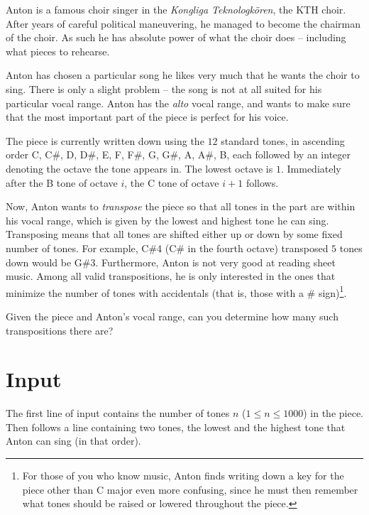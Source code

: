 
%
\noindent
Anton is a famous choir singer in the \emph{Kongliga Teknologkören}, the KTH choir.
After years of careful political maneuvering, he managed to become the chairman of the choir.
As such he has absolute power of what the choir does -- including what pieces to rehearse.

Anton has chosen a particular song he likes very much that he wants the choir to sing.
There is only a slight problem -- the song is not at all suited for his particular vocal range.
Anton has the \emph{alto} vocal range, and wants to make sure that the most important part of the piece is perfect for his voice.

The piece is currently written down using the $12$ standard tones, in ascending order C, C\#, D, D\#, E, F, F\#, G, G\#, A, A\#, B, each followed by an integer denoting the octave the tone appears in.
The lowest octave is $1$.
Immediately after the B tone of octave $i$, the C tone of octave $i + 1$ follows.

Now, Anton wants to \emph{transpose} the piece so that all tones in the part are within his vocal range, which is given by the lowest and highest tone he can sing.
Transposing means that all tones are shifted either up or down by some fixed number of tones.
For example, C\#4 (C\# in the fourth octave) transposed $5$ tones down would be G\#3.
Furthermore, Anton is not very good at reading sheet music.
Among all valid transpositions, he is only interested in the ones that minimize the number of tones with accidentals (that is, those with a \# sign)\footnote{For those of you who know music, Anton finds writing down a key for the piece other than C major even more confusing, since he must then remember what tones should be raised or lowered throughout the piece.}.

Given the piece and Anton's vocal range, can you determine how many such transpositions there are?

\section*{Input}
The first line of input contains the number of tones $n$ ($1 \le n \le 1000$) in the piece.  Then follows a line containing two tones, the lowest and the highest tone that Anton can sing (in that order).

